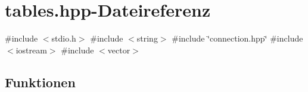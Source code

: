 \section{tables.\+hpp-\/\+Dateireferenz}
\label{tables_8hpp}
{\ttfamily \#include $<$stdio.\+h$>$}\newline
{\ttfamily \#include $<$string$>$}\newline
{\ttfamily \#include \char`\"{}connection.\+hpp\char`\"{}}\newline
{\ttfamily \#include $<$iostream$>$}\newline
{\ttfamily \#include $<$vector$>$}\newline
\subsection*{Funktionen}
